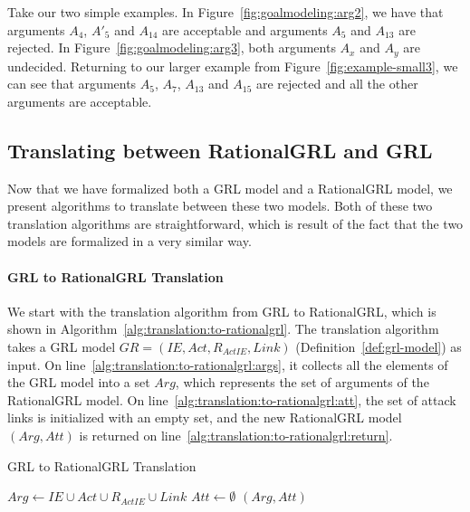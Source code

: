 Take our two simple examples. In Figure~\ref{fig:goalmodeling:arg2}, we have that arguments $A_4$, $A'_5$ and $A_{14}$ are acceptable and arguments $A_5$ and $A_{13}$ are rejected. In Figure~\ref{fig:goalmodeling:arg3}, both arguments $A_x$ and $A_y$ are undecided. Returning to our larger example from Figure~\ref{fig:example-small3}, we can see that arguments $A_5$, $A_7$, $A_{13}$ and $A_{15}$ are rejected and all the other arguments are acceptable.

\subsection{Translating between RationalGRL and GRL}
\label{sect:formalframework:translation}

Now that we have formalized both a GRL model and a RationalGRL model, we present algorithms to translate between these two models. Both of these two translation algorithms are straightforward, which is result of the fact that the two models are formalized in a very similar way.

\paragraph{GRL to RationalGRL Translation} We start with the translation algorithm from GRL to RationalGRL, which is shown in Algorithm~\ref{alg:translation:to-rationalgrl}. The translation algorithm takes a GRL model $GR=(IE, Act, R_{ActIE}, Link)$ (Definition~\ref{def:grl-model}) as input. On line~\ref{alg:translation:to-rationalgrl:args}, it collects all the elements of the GRL model into a set $Arg$, which represents the set of arguments of the RationalGRL model. On line~\ref{alg:translation:to-rationalgrl:att}, the set of attack links is initialized with an empty set, and the new RationalGRL model $(Arg, Att)$ is returned on line~\ref{alg:translation:to-rationalgrl:return}.

\begin{algorithm}[ht]
  \caption{GRL to RationalGRL Translation}
  \label{alg:translation:to-rationalgrl}
  \begin{algorithmic}[1]
    \State $Arg \leftarrow IE\cup Act \cup R_{ActIE}\cup Link$\label{alg:translation:to-rationalgrl:args}
    \State $Att \leftarrow \emptyset$\label{alg:translation:to-rationalgrl:att}
    \State \Return $(Arg, Att)$\label{alg:translation:to-rationalgrl:return}
    \EndProcedure
  \end{algorithmic}
\end{algorithm}

